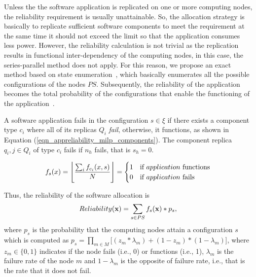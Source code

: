 Unless the the software application is replicated on one or more computing nodes, the reliability requirement is usually unattainable. So, the allocation strategy is basically to replicate sufficient software components to meet the requirement at the same time it should not exceed the limit so that the application consumes less power. However, the reliability calculation is not trivial as the replication results in functional inter-dependency of the computing nodes, in this case,  the series-parallel method does not apply. For this reason, we propose an exact method based on state enumeration~\cite{ExactMethodstoComputeNetworkRe- liability}, which basically enumerates all the possible configurations of the nodes  $PS$. Subsequently, the reliability of the application becomes the total probability of the configurations that enable the functioning of the application~\cite{Mahmud5222}.
\begin{definition}
	A software application fails in the configuration $s\in\xi$ if there exists a component type $c_i$ where all of its replicas $Q_i$ \textit{fail}, otherwise, it functions, as shown in Equation (\ref{eqn_appreliability_milp_components}).  The component replica $q_i,j\in Q_i$ of type $c_i$ fails if $n_h$ fails, that is $s_h=0$.
\end{definition}
\begin{align}
f_s(x) = \floor[\Bigg]{\frac{\sum_if_{c_i}(x,s)}{N}}=
\begin{cases}
1 & \mbox{if } application \mbox{ functions}\\
0 & \mbox{if } application \mbox{ fails}
\end{cases}\label{eqn_appreliability_milp_components}
\end{align}

Thus, the reliability of the software allocation is
\begin{align}
\label{eqn_appreliability_milp}
Reliability(\x)=\sum_{s\in PS}f_s(\x)*p_s,
\end{align}
where $p_s$ is the probability that the computing nodes attain a configuration $s$ which is computed as $p_s=\prod_{m\in M}\big[(z_m*\lambda_m) + (1-z_m)*(1-\lambda_m)\big]$, where $z_m\in\{0,1\}$ indicates if the node fails (i.e., 0) or functions (i.e., 1), $\lambda_m$ is the failure rate of the node $m$ and $1-\lambda_m$ is the opposite of failure rate, i.e., that is the rate that it does not fail.
